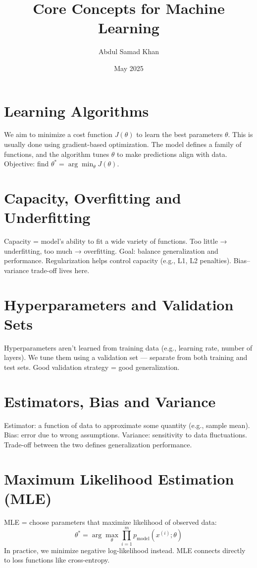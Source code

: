 \documentclass{article}
\title{Core Concepts for Machine Learning}
\author{Abdul Samad Khan}
\date{May 2025}
\theoremstyle{plain}
\theoremstyle{definition}
\begin{document}
\maketitle

\section*{Learning Algorithms}
We aim to minimize a cost function $J(\theta)$ to learn the best parameters $\theta$. This is usually done using gradient-based optimization. The model defines a family of functions, and the algorithm tunes $\theta$ to make predictions align with data. Objective: find $\theta^* = \arg \min_\theta J(\theta)$.

\section*{Capacity, Overfitting and Underfitting}
Capacity = model's ability to fit a wide variety of functions. Too little → underfitting, too much → overfitting. Goal: balance generalization and performance. Regularization helps control capacity (e.g., L1, L2 penalties). Bias–variance trade-off lives here.

\section*{Hyperparameters and Validation Sets}
Hyperparameters aren't learned from training data (e.g., learning rate, number of layers). We tune them using a validation set — separate from both training and test sets. Good validation strategy = good generalization.

\section*{Estimators, Bias and Variance}
Estimator: a function of data to approximate some quantity (e.g., sample mean). Bias: error due to wrong assumptions. Variance: sensitivity to data fluctuations. Trade-off between the two defines generalization performance.

\section*{Maximum Likelihood Estimation (MLE)}
MLE = choose parameters that maximize likelihood of observed data:
\[
\theta^* = \arg\max_\theta \prod_{i=1}^m p_{\text{model}}(x^{(i)}; \theta)
\]
In practice, we minimize negative log-likelihood instead. MLE connects directly to loss functions like cross-entropy.
\end{document}
